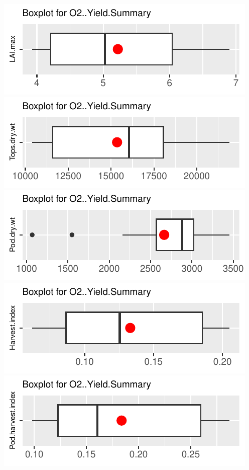 \documentclass[
]{article}
\begin{document}
\includegraphics{FL_Crop_BMP_QA_single_dataset_files/figure-latex/check-content-of-sheets-24.pdf}
\includegraphics{FL_Crop_BMP_QA_single_dataset_files/figure-latex/check-content-of-sheets-25.pdf}
\includegraphics{FL_Crop_BMP_QA_single_dataset_files/figure-latex/check-content-of-sheets-26.pdf}
\includegraphics{FL_Crop_BMP_QA_single_dataset_files/figure-latex/check-content-of-sheets-27.pdf}
\includegraphics{FL_Crop_BMP_QA_single_dataset_files/figure-latex/check-content-of-sheets-28.pdf}
\end{document}

